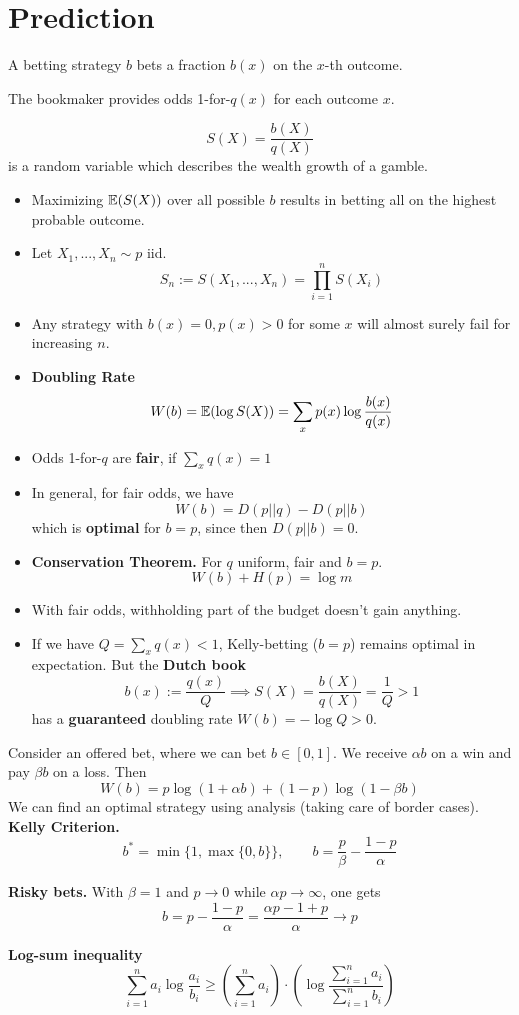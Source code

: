 \section{Prediction}

A betting strategy \(b\) bets a fraction \(b(x)\) on the \(x\)-th outcome.

The bookmaker provides odds 1-for-\(q(x)\) for each outcome \(x\).

\[S(X) = \frac{b(X)}{q(X)}\] is a random variable which describes the wealth growth of a gamble.
\begin{itemize}[label=-]
    \item Maximizing \(\mathbb{E}(S(X))\) over all possible \(b\) results in betting all on the highest probable outcome. 
    \item Let \(X_1,...,X_n \sim p\) iid. \[S_n := S(X_1, ..., X_n) = \prod_{i = 1}^{n}S(X_i)\]
    \item Any strategy with \(b(x) = 0, p(x) > 0\) for some \(x\) will almost surely fail for increasing \(n\).
    \item \textbf{Doubling Rate}
    \[W(b) = \mathbb{E}(\log S(X)) = \sum_{x} p(x) \log \frac{b(x)}{q(x)}\]
    \item Odds 1-for-\(q\) are \textbf{fair}, if \(\sum_{x}q(x) = 1\)
    \item In general, for fair odds, we have \[W(b) = D(p || q) - D(p || b)\]
    which is \textbf{optimal} for \(b = p\), since then \(D(p || b) = 0\).
    \item \textbf{Conservation Theorem.} For \(q\) uniform, fair and \(b = p\). 
    \[W(b) + H(p) = \log m\] 
    \item With fair odds, withholding part of the budget doesn't gain anything.
    \item If we have \(Q = \sum_{x} q(x) < 1\), Kelly-betting (\(b = p\)) remains optimal in expectation. 
    But the \textbf{Dutch book} 
    \[b(x) := \frac{q(x)}{Q} \implies S(X) = \frac{b(X)}{q(X)} = \frac{1}{Q} > 1\]
    has a \textbf{guaranteed} doubling rate \(W(b) = - \log Q > 0\).
\end{itemize}
Consider an offered bet, where we can bet \(b \in [0, 1]\). We receive \(\alpha b\) on a win and pay \(\beta b\) on a loss.
Then \[W(b) = p \log(1 + \alpha b) + (1-p) \log(1- \beta b)\]
We can find an optimal strategy using analysis (taking care of border cases).
\textbf{Kelly Criterion.} 
\[b^* = \min\{1, \max\{0, b\}\}, \qquad b = \frac{p}{\beta} - \frac{1-p}{\alpha}\]


\textbf{Risky bets.} With \(\beta = 1\) and \(p \to 0\) while \(\alpha p \to \infty\), one gets
\[b = p - \frac{1-p}{\alpha} = \frac{\alpha p - 1 + p}{\alpha} \to p\]

\textbf{Log-sum inequality}
\[\sum_{i = 1}^n a_i \log \frac{a_i}{b_i} \geq \left(\sum_{i = 1}^n a_i\right) \cdot 
\left(\log \frac{\sum_{i= 1}^n a_i}{\sum_{i = 1}^n b_i}\right)\]

